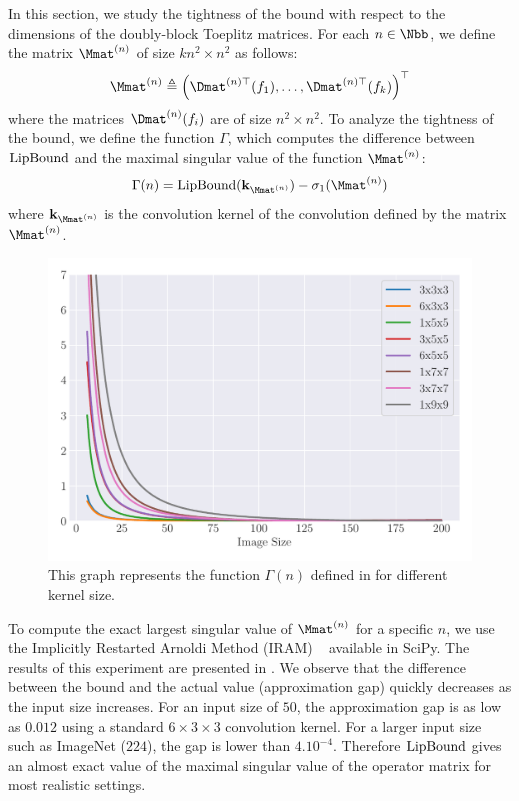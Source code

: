 In this section, we study the tightness of the bound with respect to the dimensions of the doubly-block Toeplitz matrices.
For each $n \in \Nbb$, we define the matrix  $\Mmat^{(n)}$ of size $kn^2 \times n^2$ as follows:
\begin{equation}
  \Mmat^{(n)} \triangleq \textstyle \leftmat \Dmat^{(n)\top}(f_1), \dots, \Dmat^{(n)\top}(f_k) \textstyle \rightmat^\top
\end{equation}
where the matrices $\Dmat^{(n)}(f_i)$ are of size $n^2 \times n^2$. 
To analyze the tightness of the bound, we define the function $\Gamma$, which computes the difference between $\mathrm{LipBound}$ and the maximal singular value of the function $\Mmat^{(n)}$:
\begin{equation} \label{equation:function_convergence}
  \Gamma(n) = \lipbound(\mathbf{k}_{\Mmat^{(n)}}) - \sigma_1(\Mmat^{(n)})
\end{equation}
where $\mathbf{k}_{\Mmat^{(n)}}$ is the  convolution kernel of the convolution defined by the matrix $\Mmat^{(n)}$.

\begin{figure}[ht]
  \centering
  \includegraphics[width=\scalefigure\textwidth]{figures/main/ch5-lipschitz_regularization/convergence_bounds.pdf}
  \caption{This graph represents the function $\Gamma(n)$ defined in  for different kernel size.}
  \label{figure:convergence_bound}
\end{figure}


To compute the exact largest singular value of $\Mmat^{(n)}$ for a specific $n$, we use the Implicitly Restarted Arnoldi Method (IRAM) ~\cite{lehoucq1996deflation} available in SciPy.
The results of this experiment are presented in .
We observe that the difference between the bound and the actual value (approximation gap) quickly decreases as the input size increases.
For an input size of $50$, the approximation gap is as low as $0.012$ using a standard $6\times3\times3$ convolution kernel.
For a larger input size such as ImageNet ($224$), the gap is lower than $4.10^{-4}$.
Therefore $\mathrm{LipBound}$ gives an almost exact value of the maximal singular value of the operator matrix for most realistic settings.

